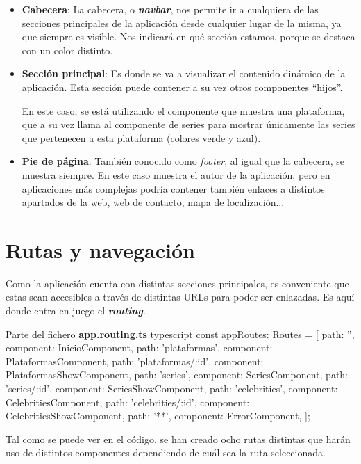 \documentclass{\ClassPath/viu-tfm-template}
\begin{document}
\begin{itemize}
    \item \textbf{Cabecera}: La cabecera, o \textit{\textbf{navbar}}, nos permite ir a cualquiera de las secciones principales de la aplicación desde cualquier lugar de la misma, ya que siempre es visible. Nos indicará en qué sección estamos, porque se destaca con un color distinto.

    \item \textbf{Sección principal}: Es donde se va a visualizar el contenido dinámico de la aplicación. Esta sección puede contener a su vez otros componentes “hijos”.

    En este caso, se está utilizando el componente que muestra una plataforma, que a su vez llama al componente de series para mostrar únicamente las series que pertenecen a esta plataforma (colores verde y azul).

    \item \textbf{Pie de página}: También conocido como \textit{footer}, al igual que la cabecera, se muestra siempre. En este caso muestra el autor de la aplicación, pero en aplicaciones más complejas podría contener también enlaces a distintos apartados de la web, web de contacto, mapa de localización...
\end{itemize}

\section{Rutas y navegación}
Como la aplicación cuenta con distintas secciones principales, es conveniente que estas sean accesibles a través de distintas URLs para poder ser enlazadas. Es aquí donde entra en juego el \textbf{\textit{routing}}.

\begin{mycode}{Parte del fichero \textbf{app.routing.ts} }{typescript}{}
const appRoutes: Routes = [
  {path: '', component: InicioComponent},
  {path: 'plataformas', component: PlataformasComponent},
  {path: 'plataformas/:id', component: PlataformasShowComponent},
  {path: 'series', component: SeriesComponent},
  {path: 'series/:id', component: SeriesShowComponent},
  {path: 'celebrities', component: CelebritiesComponent},
  {path: 'celebrities/:id', component: CelebritiesShowComponent},
  {path: '**', component: ErrorComponent},
];
\end{mycode}

Tal como se puede ver en el código, se han creado ocho rutas distintas que harán uso de distintos componentes dependiendo de cuál sea la ruta seleccionada.
\end{document}
